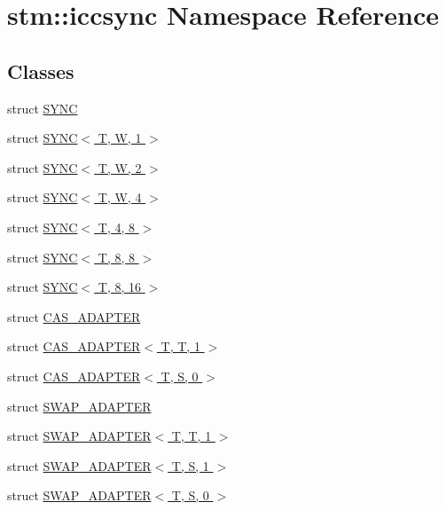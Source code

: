 \hypertarget{namespacestm_1_1iccsync}{\section{stm\-:\-:iccsync Namespace Reference}
\label{namespacestm_1_1iccsync}
}
\subsection*{Classes}
\begin{DoxyCompactItemize}
\item 
struct \hyperlink{structstm_1_1iccsync_1_1SYNC}{S\-Y\-N\-C}
\item 
struct \hyperlink{structstm_1_1iccsync_1_1SYNC_3_01T_00_01W_00_011_01_4}{S\-Y\-N\-C$<$ T, W, 1 $>$}
\item 
struct \hyperlink{structstm_1_1iccsync_1_1SYNC_3_01T_00_01W_00_012_01_4}{S\-Y\-N\-C$<$ T, W, 2 $>$}
\item 
struct \hyperlink{structstm_1_1iccsync_1_1SYNC_3_01T_00_01W_00_014_01_4}{S\-Y\-N\-C$<$ T, W, 4 $>$}
\item 
struct \hyperlink{structstm_1_1iccsync_1_1SYNC_3_01T_00_014_00_018_01_4}{S\-Y\-N\-C$<$ T, 4, 8 $>$}
\item 
struct \hyperlink{structstm_1_1iccsync_1_1SYNC_3_01T_00_018_00_018_01_4}{S\-Y\-N\-C$<$ T, 8, 8 $>$}
\item 
struct \hyperlink{structstm_1_1iccsync_1_1SYNC_3_01T_00_018_00_0116_01_4}{S\-Y\-N\-C$<$ T, 8, 16 $>$}
\item 
struct \hyperlink{structstm_1_1iccsync_1_1CAS__ADAPTER}{C\-A\-S\-\_\-\-A\-D\-A\-P\-T\-E\-R}
\item 
struct \hyperlink{structstm_1_1iccsync_1_1CAS__ADAPTER_3_01T_00_01T_00_011_01_4}{C\-A\-S\-\_\-\-A\-D\-A\-P\-T\-E\-R$<$ T, T, 1 $>$}
\item 
struct \hyperlink{structstm_1_1iccsync_1_1CAS__ADAPTER_3_01T_00_01S_00_010_01_4}{C\-A\-S\-\_\-\-A\-D\-A\-P\-T\-E\-R$<$ T, S, 0 $>$}
\item 
struct \hyperlink{structstm_1_1iccsync_1_1SWAP__ADAPTER}{S\-W\-A\-P\-\_\-\-A\-D\-A\-P\-T\-E\-R}
\item 
struct \hyperlink{structstm_1_1iccsync_1_1SWAP__ADAPTER_3_01T_00_01T_00_011_01_4}{S\-W\-A\-P\-\_\-\-A\-D\-A\-P\-T\-E\-R$<$ T, T, 1 $>$}
\item 
struct \hyperlink{structstm_1_1iccsync_1_1SWAP__ADAPTER_3_01T_00_01S_00_011_01_4}{S\-W\-A\-P\-\_\-\-A\-D\-A\-P\-T\-E\-R$<$ T, S, 1 $>$}
\item 
struct \hyperlink{structstm_1_1iccsync_1_1SWAP__ADAPTER_3_01T_00_01S_00_010_01_4}{S\-W\-A\-P\-\_\-\-A\-D\-A\-P\-T\-E\-R$<$ T, S, 0 $>$}
\end{DoxyCompactItemize}
